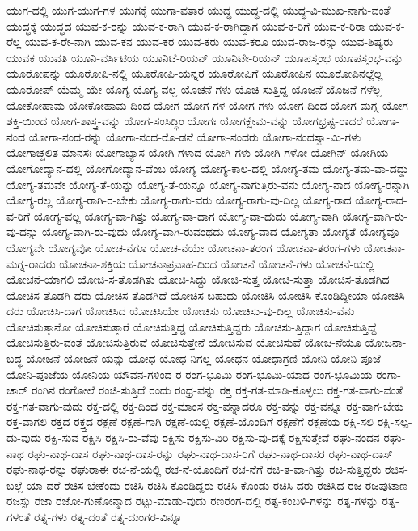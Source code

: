 {ಯುಗ-ದಲ್ಲಿ
ಯುಗ-ಯುಗ-ಗಳ
ಯುಗಕ್ಕೆ
ಯುಗಾ-ವತಾರ
ಯುದ್ಧ
ಯುದ್ಧ-ದಲ್ಲಿ
ಯುದ್ಧ-ವಿ-ಮುಖ-ನಾಗು-ವಂತೆ
ಯುದ್ಧಕ್ಕೆ
ಯುದ್ಧದ
ಯುವ-ಕ-ರನ್ನು
ಯುವ-ಕ-ರಾಗಿ
ಯುವ-ಕ-ರಾಗಿದ್ದಾಗ
ಯುವ-ಕ-ರಿಗೆ
ಯುವ-ಕ-ರಿರಾ
ಯುವ-ಕ-ರೆಲ್ಲ
ಯುವ-ಕ-ರೇ-ನಾಗಿ
ಯುವ-ಕನ
ಯುವ-ಕರ
ಯುವ-ಕರು
ಯುವ-ಕರೂ
ಯುವ-ರಾಜ-ರನ್ನು
ಯುವ-ಶಿಷ್ಯರು
ಯುವಕ
ಯುವತಿ
ಯೂನಿ-ವರ್ಸಿಟಿಯ
ಯೂನಿಟೆ-ರಿಯನ್
ಯೂನಿಟೇ-ರಿಯನ್
ಯೂಪಸ್ತಂಭ
ಯೂಪಸ್ತಂಭ-ವನ್ನು
ಯೂರೋಪನ್ನು
ಯೂರೋಪಿ-ನಲ್ಲಿ
ಯೂರೋಪಿ-ಯನ್ನರ
ಯೂರೋಪಿಗೆ
ಯೂರೋಪಿನ
ಯೂರೋಪಿನಲ್ಲೆಲ್ಲ
ಯೂರೋಪ್
ಯೆಮ್ಮ
ಯೇ
ಯೊಗ್ಯ
ಯೊಗ್ಯ-ವಲ್ಲ
ಯೊಚನೆ-ಗಳು
ಯೊಚಿ-ಸುತ್ತಿದ್ದ
ಯೊಜನೆ
ಯೊಜನೆ-ಗಳೆಲ್ಲ
ಯೋಕೋಹಾಮ
ಯೋಕೋಹಾಮ-ದಿಂದ
ಯೋಗ
ಯೋಗ-ಗಳ
ಯೋಗ-ಗಳು
ಯೋಗ-ದಿಂದ
ಯೋಗ-ಮಗ್ನ
ಯೋಗ-ಶಕ್ತಿ-ಯಿಂದ
ಯೋಗ-ಶಾಸ್ತ್ರ-ವನ್ನು
ಯೋಗ-ಸಂಸಿದ್ಧಿಂ
ಯೋಗಃ
ಯೋಗಕ್ಷೇಮ-ವನ್ನು
ಯೋಗಭ್ರಷ್ಟ-ರಾದರೆ
ಯೋಗಾ-ನಂದ
ಯೋಗಾ-ನಂದ-ರನ್ನು
ಯೋಗಾ-ನಂದ-ರೊ-ಡನೆ
ಯೋಗಾ-ನಂದರು
ಯೋಗಾ-ನಂದಸ್ವಾ-ಮಿ-ಗಳು
ಯೋಗಾಚ್ಚಲಿತ-ಮಾನಸಃ
ಯೋಗಾಭ್ಯಾಸ
ಯೋಗಿ-ಗಳಾದ
ಯೋಗಿ-ಗಳು
ಯೋಗಿ-ಗಳೋ
ಯೋಗಿನ್
ಯೋಗಿಯ
ಯೋಗೋದ್ಯಾನ-ದಲ್ಲಿ
ಯೋಗೋದ್ಯಾನ-ವೆಂಬ
ಯೋಗ್ಯ
ಯೋಗ್ಯ-ಕಾಲ-ದಲ್ಲಿ
ಯೋಗ್ಯ-ತಮ
ಯೋಗ್ಯ-ತಮ-ವಾ-ದದ್ದು
ಯೋಗ್ಯ-ತಮವೇ
ಯೋಗ್ಯ-ತೆ-ಯನ್ನು
ಯೋಗ್ಯ-ತೆ-ಯನ್ನೂ
ಯೋಗ್ಯ-ನಾಗುತ್ತಿರು-ವನು
ಯೋಗ್ಯ-ನಾದ
ಯೋಗ್ಯ-ರನ್ನಾಗಿ
ಯೋಗ್ಯ-ರಲ್ಲ
ಯೋಗ್ಯ-ರಾಗಿ-ರ-ಬೇಕು
ಯೋಗ್ಯ-ರಾಗು-ವರು
ಯೋಗ್ಯ-ರಾಗು-ವು-ದಿಲ್ಲ
ಯೋಗ್ಯ-ರಾದ
ಯೋಗ್ಯ-ರಾದ-ವ-ರಿಗೆ
ಯೋಗ್ಯ-ವಲ್ಲ
ಯೋಗ್ಯ-ವಾ-ಗಿತ್ತು
ಯೋಗ್ಯ-ವಾ-ದಾಗ
ಯೋಗ್ಯ-ವಾ-ದುದು
ಯೋಗ್ಯ-ವಾಗಿ
ಯೋಗ್ಯ-ವಾಗಿ-ರು-ವು-ದನ್ನು
ಯೋಗ್ಯ-ವಾಗಿ-ರು-ವುದು
ಯೋಗ್ಯ-ವಾಗಿ-ರುವಂಥದು
ಯೋಗ್ಯ-ವಾದ
ಯೋಗ್ಯತಾ
ಯೋಗ್ಯತೆ
ಯೋಗ್ಯವೂ
ಯೋಗ್ಯವೇ
ಯೋಗ್ಯವೋ
ಯೋಚ-ನೆಗೂ
ಯೋಚ-ನೆಯೇ
ಯೋಚನಾ-ತರಂಗ
ಯೋಚನಾ-ತರಂಗ-ಗಳು
ಯೋಚನಾ-ಮಗ್ನ-ರಾದರು
ಯೋಚನಾ-ಶಕ್ತಿಯ
ಯೋಚನಾಪ್ರವಾಹ-ದಿಂದ
ಯೋಚನೆ
ಯೋಚನೆ-ಗಳು
ಯೋಚನೆ-ಯಲ್ಲಿ
ಯೋಚನೆ-ಯಾಗಲಿ
ಯೋಚಿ-ಸ-ತೊಡಗಿತು
ಯೋಚಿ-ಸಿದ್ದು
ಯೋಚಿ-ಸುತ್ತ
ಯೋಚಿ-ಸುತ್ತಾ
ಯೋಚಿಸ-ತೊಡಗಿದ
ಯೋಚಿಸ-ತೊಡಗಿ-ದರು
ಯೋಚಿಸ-ತೊಡಗಿದೆ
ಯೋಚಿಸ-ಬಹುದು
ಯೋಚಿಸಿ
ಯೋಚಿಸಿ-ಕೊಂಡಿದ್ದೀಯಾ
ಯೋಚಿಸಿ-ದರು
ಯೋಚಿಸಿ-ದಾಗ
ಯೋಚಿಸಿದ
ಯೋಚಿಸಿಯೇ
ಯೋಚಿಸು
ಯೋಚಿಸು-ವು-ದಿಲ್ಲ
ಯೋಚಿಸು-ವೆನು
ಯೋಚಿಸುತ್ತಾನೋ
ಯೋಚಿಸುತ್ತಾರೆ
ಯೋಚಿಸುತ್ತಿದ್ದ
ಯೋಚಿಸುತ್ತಿದ್ದರು
ಯೋಚಿಸು-ತ್ತಿದ್ದಾಗ
ಯೋಚಿಸುತ್ತಿದ್ದೆ
ಯೋಚಿಸುತ್ತಿರು-ವಂತೆ
ಯೋಚಿಸುತ್ತಿರುವೆ
ಯೋಚಿಸುತ್ತೇನೆ
ಯೋಚಿಸುವ
ಯೋಚಿಸುವೆ
ಯೋಜ-ನೆಯೂ
ಯೋಜನಾ-ಬದ್ಧ
ಯೋಜನೆ
ಯೋಜನೆ-ಯನ್ನು
ಯೋಧ
ಯೋಧ-ನಿಗಲ್ಲ
ಯೋಧನ
ಯೋಧಾಗ್ರಣಿ
ಯೋನಿ
ಯೋನಿ-ಪೂಜೆ
ಯೋನಿ-ಪೂಜೆಯ
ಯೋನಿಯ
ಯೌವನ-ಗಳಿಂದ
ರ
ರಂಗ-ಭೂಮಿ
ರಂಗ-ಭೂಮಿ-ಯಾದ
ರಂಗ-ಭೂಮಿಯ
ರಂಗಾ-ಚಾರ್
ರಂಗಿನ
ರಂಗೋಲೆ
ರಂಜಿ-ಸುತ್ತಿದೆ
ರಂದು
ರಂಧ್ರ-ವನ್ನು
ರಕ್ತ
ರಕ್ತ-ಗತ-ಮಾಡಿ-ಕೊಳ್ಳಲು
ರಕ್ತ-ಗತ-ವಾಗು-ವಂತೆ
ರಕ್ತ-ಗತ-ವಾಗು-ವುದು
ರಕ್ತ-ದಲ್ಲಿ
ರಕ್ತ-ದಿಂದ
ರಕ್ತ-ಮಾಂಸ
ರಕ್ತ-ವನ್ನಾದರೂ
ರಕ್ತ-ವನ್ನು
ರಕ್ತ-ವನ್ನೂ
ರಕ್ತ-ವಾಗ-ಬೇಕು
ರಕ್ತ-ವಾಗಲಿ
ರಕ್ತದ
ರಕ್ತ್ತದ
ರಕ್ಷಣೆ
ರಕ್ಷಣೆ-ಗಾಗಿ
ರಕ್ಷಣೆ-ಯಲ್ಲಿ
ರಕ್ಷಣೆ-ಯೊಂದಿಗೆ
ರಕ್ಷಣೆಗೆ
ರಕ್ಷಣೆಯ
ರಕ್ಷಿ-ಸಲಿ
ರಕ್ಷಿ-ಸಲ್ಪ-ಡು-ವುದು
ರಕ್ಷಿ-ಸುವ
ರಕ್ಷಿಸಿ
ರಕ್ಷಿಸಿ-ರು-ವೆವು
ರಕ್ಷಿಸು
ರಕ್ಷಿಸು-ವಿರಿ
ರಕ್ಷಿಸು-ವು-ದಕ್ಕೆ
ರಕ್ಷಿಸುತ್ತೇವೆ
ರಘು-ನಂದನ
ರಘು-ನಾಥ
ರಘು-ನಾಥ-ದಾಸ
ರಘು-ನಾಥ-ದಾಸ-ರನ್ನು
ರಘು-ನಾಥ-ದಾಸ-ರಿಗೆ
ರಘು-ನಾಥ-ದಾಸರ
ರಘು-ನಾಥ-ದಾಸ್
ರಘು-ನಾಥ-ರನ್ನು
ರಘುರಾಈ
ರಚ-ನೆ-ಯಲ್ಲಿ
ರಚ-ನೆ-ಯೊಂದಿಗೆ
ರಚ-ನೆಗೆ
ರಚಿ-ತ-ವಾ-ಗಿತ್ತು
ರಚಿ-ಸುತ್ತಿದ್ದರು
ರಚಿಸ-ಬಲ್ಲೆ-ಯಾ-ದರೆ
ರಚಿಸ-ಬೇಕೆಂದು
ರಚಿಸಿ
ರಚಿಸಿ-ಕೊಂಡಿದ್ದರು
ರಚಿಸಿ-ಕೊಂಡು
ರಚಿಸಿ-ದರು
ರಚಿಸಿದ
ರಜ
ರಜಪುಟಾಣ
ರಜಸ್ಸು
ರಜಾ
ರಜೋ-ಗುಣೋನ್ಮಾದ
ರಟ್ಟು-ಮಾಡು-ವುದು
ರಣರಂಗ-ದಲ್ಲಿ
ರತ್ನ-ಕಂಬಳಿ-ಗಳನ್ನು
ರತ್ನ-ಗಳನ್ನು
ರತ್ನ-ಗಳಂತೆ
ರತ್ನ-ಗಳು
ರತ್ನ-ದಂತೆ
ರತ್ನ-ದುಂಗರ-ವಿನ್ನೂ
}
